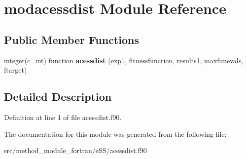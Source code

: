 \hypertarget{classmodacessdist}{\section{modacessdist Module Reference}
\label{classmodacessdist}
}
\subsection*{Public Member Functions}
\begin{DoxyCompactItemize}
\item 
\hypertarget{classmodacessdist_a17fbdb62d69a239e2ae858ea4393b7fb}{integer(c\-\_\-int) function {\bfseries acessdist} (exp1, fitnessfunction, results1, maxfunevals, ftarget)}\label{classmodacessdist_a17fbdb62d69a239e2ae858ea4393b7fb}

\end{DoxyCompactItemize}


\subsection{Detailed Description}


Definition at line 1 of file acessdist.\-f90.



The documentation for this module was generated from the following file\-:\begin{DoxyCompactItemize}
\item 
src/method\-\_\-module\-\_\-fortran/e\-S\-S/acessdist.\-f90\end{DoxyCompactItemize}
